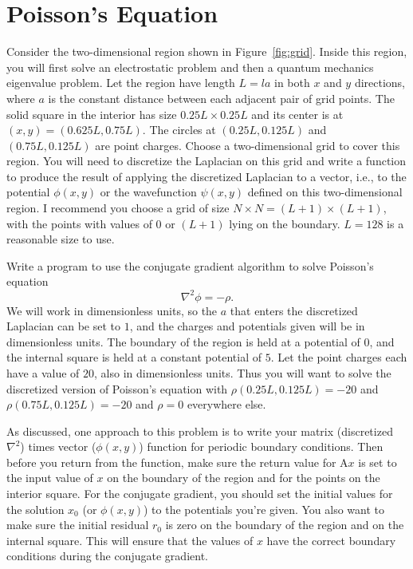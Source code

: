 \section{Poisson's Equation}\label{sec:pe}



Consider the two-dimensional region shown in Figure~\ref{fig:grid}.
Inside this region, you will first
solve an electrostatic problem and then a quantum mechanics eigenvalue problem. Let the
region have length \(L = l a\) in both \(x\) and \(y\) directions,
where \(a\) is the constant distance between each adjacent pair of grid points.
The solid square in the interior has size \(0.25L \times 0.25L\) and its center is
at \((x, y) = (0.625L, 0.75L)\). The circles at \((0.25L, 0.125L)\) and \((0.75L, 0.125L)\) are
point charges. Choose a two-dimensional grid to cover this region. You will need to
discretize the Laplacian on this grid and write a function to produce the result of applying
the discretized Laplacian to a vector, i.e., to the potential \(\phi(x, y)\) or the
wavefunction \(\psi(x, y)\) defined on this two-dimensional region. I recommend you choose a
grid of size \(N \times N = (L + 1) \times (L + 1)\),
with the points with values of \(0\) or \((L + 1)\)
lying on the boundary. \(L = 128\) is a reasonable size to use.

Write a program to use the conjugate gradient algorithm to solve Poisson's equation
%
\begin{equation}\label{eq:poisson}
    \nabla^2 \phi = -\rho.
\end{equation}
%
We will work in dimensionless units, so the \(a\) that enters the discretized Laplacian can be
set to \(1\), and the charges and potentials given will be in dimensionless units. The
boundary of the region is held at a potential of \(0\), and the internal square is held at a
constant potential of \(5\). Let the point charges each have a value of \(20\), also in
dimensionless units. Thus you will want to solve the discretized version of Poisson's
equation with \(\rho(0.25L, 0.125L) = -20\) and \(\rho(0.75L, 0.125L) = -20\) and \(\rho = 0\)
everywhere else.

As discussed, one approach to this problem is to write your matrix
(discretized \(\nabla^2\)) times vector (\(\phi(x, y)\)) function for periodic boundary
conditions. Then before you return from the function, make sure the return value for
\(\mathrm{ A } x\) is set to the input value of \(x\) on the boundary of the region and for
the points on the interior square. For the conjugate gradient, you should set the initial
values for the solution \(x_0\) (or \(\phi(x, y)\)) to the potentials you're given. You also
want to make sure the initial residual \(r_0\) is zero on the boundary of the region and on
the internal square. This will ensure that the values of \(x\) have the correct boundary
conditions during the conjugate gradient.

